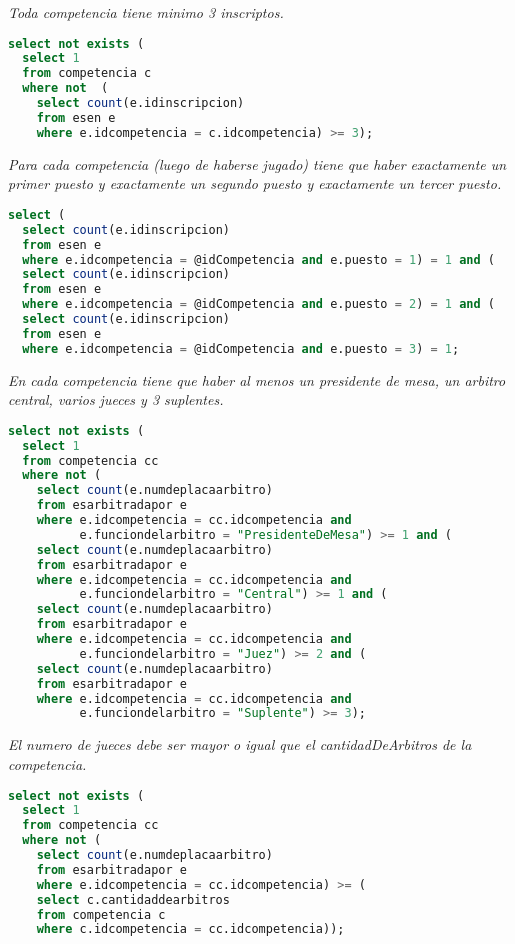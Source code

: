 \emph{Toda competencia tiene minimo 3 inscriptos.}

\begin{lstlisting}[language=SQL]
select not exists (
  select 1
  from competencia c
  where not  (
    select count(e.idinscripcion)
    from esen e
    where e.idcompetencia = c.idcompetencia) >= 3);
\end{lstlisting}

\emph{Para cada competencia (luego de haberse jugado) tiene que haber exactamente un primer puesto y exactamente un segundo puesto y exactamente un tercer puesto.}

\begin{lstlisting}[language=SQL]
select (
  select count(e.idinscripcion)
  from esen e
  where e.idcompetencia = @idCompetencia and e.puesto = 1) = 1 and (
  select count(e.idinscripcion)
  from esen e
  where e.idcompetencia = @idCompetencia and e.puesto = 2) = 1 and (
  select count(e.idinscripcion)
  from esen e
  where e.idcompetencia = @idCompetencia and e.puesto = 3) = 1;
\end{lstlisting}

\emph{En cada competencia tiene que haber al menos un presidente de mesa, un arbitro central, varios jueces y 3 suplentes.}

\begin{lstlisting}[language=SQL]
select not exists (
  select 1
  from competencia cc
  where not (
    select count(e.numdeplacaarbitro)
    from esarbitradapor e
    where e.idcompetencia = cc.idcompetencia and
          e.funciondelarbitro = "PresidenteDeMesa") >= 1 and (
    select count(e.numdeplacaarbitro)
    from esarbitradapor e
    where e.idcompetencia = cc.idcompetencia and
          e.funciondelarbitro = "Central") >= 1 and (
    select count(e.numdeplacaarbitro)
    from esarbitradapor e
    where e.idcompetencia = cc.idcompetencia and
          e.funciondelarbitro = "Juez") >= 2 and (
    select count(e.numdeplacaarbitro)
    from esarbitradapor e
    where e.idcompetencia = cc.idcompetencia and
          e.funciondelarbitro = "Suplente") >= 3);
\end{lstlisting}

\emph{El numero de jueces debe ser mayor o igual que el cantidadDeArbitros de la competencia.}

\begin{lstlisting}[language=SQL]
select not exists (
  select 1
  from competencia cc
  where not (
    select count(e.numdeplacaarbitro)
    from esarbitradapor e
    where e.idcompetencia = cc.idcompetencia) >= (
    select c.cantidaddearbitros
    from competencia c
    where c.idcompetencia = cc.idcompetencia));
\end{lstlisting}

